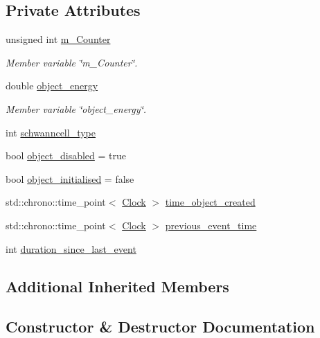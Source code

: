 \subsection*{Private Attributes}
\begin{DoxyCompactItemize}
\item 
unsigned int \mbox{\hyperlink{classSchwannCell_a6a72f907dbb2b8516f2292e0d82f887d}{m\+\_\+\+Counter}}
\begin{DoxyCompactList}\small\item\em Member variable \char`\"{}m\+\_\+\+Counter\char`\"{}. \end{DoxyCompactList}\item 
double \mbox{\hyperlink{classSchwannCell_a16689a4b1f42cabe7de168440c815edd}{object\+\_\+energy}}
\begin{DoxyCompactList}\small\item\em Member variable \char`\"{}object\+\_\+energy\char`\"{}. \end{DoxyCompactList}\item 
int \mbox{\hyperlink{classSchwannCell_a6b045b7f7bf629cd9f75b58c40f5b7c1}{schwanncell\+\_\+type}}
\item 
bool \mbox{\hyperlink{classSchwannCell_a3fe616a8aadf62602a0aeff0f3d4d491}{object\+\_\+disabled}} = true
\item 
bool \mbox{\hyperlink{classSchwannCell_aa9264dbe039d439956f94391769fda5f}{object\+\_\+initialised}} = false
\item 
std\+::chrono\+::time\+\_\+point$<$ \mbox{\hyperlink{universe_8h_a0ef8d951d1ca5ab3cfaf7ab4c7a6fd80}{Clock}} $>$ \mbox{\hyperlink{classSchwannCell_ac5c518c34e3c2afb70bc2780c1b74439}{time\+\_\+object\+\_\+created}}
\item 
std\+::chrono\+::time\+\_\+point$<$ \mbox{\hyperlink{universe_8h_a0ef8d951d1ca5ab3cfaf7ab4c7a6fd80}{Clock}} $>$ \mbox{\hyperlink{classSchwannCell_acea7e2f40d807a2ca973c4c8de90c879}{previous\+\_\+event\+\_\+time}}
\item 
int \mbox{\hyperlink{classSchwannCell_ad2281f878b3aec7ce7ba31f27f698daa}{duration\+\_\+since\+\_\+last\+\_\+event}}
\end{DoxyCompactItemize}
\subsection*{Additional Inherited Members}


\subsection{Constructor \& Destructor Documentation}
\mbox{\label{classSchwannCell_aab3414e0d6266c5b791a000c39359ca5}} 

